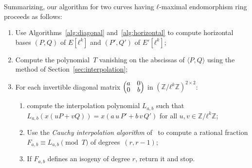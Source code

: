 \documentclass{lms}
\def\mat#1{\begin{pmatrix}#1\end{pmatrix}}
\def\smat#1{{\def\arraystretch{.7}\mat{#1}}}
\begin{document}
Summarizing, our algorithm for two curves having $ℓ$-maximal
endomorphism ring proceeds as follows:
\begin{enumerate}
\item\label{alg:ours:horizontal} Use Algorithms~\ref{alg:diagonal}
  and~\ref{alg:horizontal} to compute horizontal bases $(P,Q)$ of
  $E[ℓ^k]$ and $(P',Q')$ of $E'[ℓ^k]$;
\item\label{alg:ours:T} Compute the polynomial~$T$ vanishing
  on the abscissas of $\langle P,Q\rangle$ using the method of
  Section~\ref{sec:interpolation};
\item\label{alg:ours:for} For each invertible diagonal matrix
  $\smat{a&0\\0&b}$ in $(ℤ/ℓ^k ℤ)^{2×2}$:
  \begin{enumerate}
  \item\label{alg:ours:interp} compute the interpolation polynomial
    $L_{a,b}$ such that
    $L_{a,b} (x (u P + v Q)) = x(a\, u\,P' + b\,v\, Q')$ for all
    $u, v ∈ ℤ/ℓ^k ℤ$;
  \item\label{alg:ours:cauchy} Use the \emph{Cauchy interpolation
      algorithm} of~\cite[Chapter~5.8]{vzGG} to compute a rational
    fraction $F_{a,b}≡L_{a,b}\pmod{T}$ of degrees~$(r, r-1)$;
  \item If $F_{a,b}$ defines an isogeny of degree $r$, return it and
    stop.
  \end{enumerate}
\end{enumerate}
\end{document}
